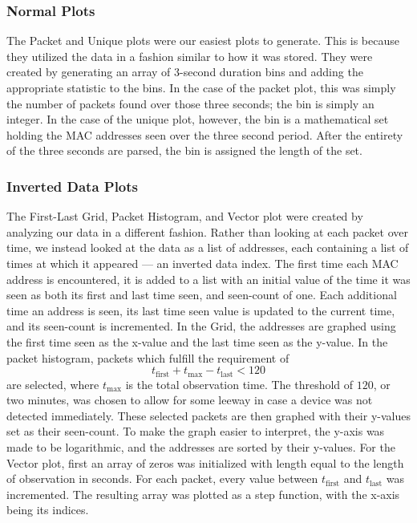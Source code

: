 \subsubsection*{Normal Plots}
The Packet and Unique plots were our easiest plots to generate.
This is because they utilized the data in a fashion similar to how it was stored.
They were created by generating an array of 3-second duration bins and adding the appropriate statistic to the bins.
In the case of the packet plot, this was simply the number of packets found over those three seconds; the bin is simply an integer.
In the case of the unique plot, however, the bin is a mathematical set holding the MAC addresses seen over the three second period.
After the entirety of the three seconds are parsed, the bin is assigned the length of the set.

\subsubsection*{Inverted Data Plots}
The First-Last Grid, Packet Histogram, and Vector plot were created by analyzing our data in a different fashion.
Rather than looking at each packet over time, we instead looked at the data as a list of addresses, each containing a list of times at which it appeared --- an inverted data index.
The first time each MAC address is encountered, it is added to a list with an initial value of the time it was seen as both its first and last time seen, and seen-count of one.
Each additional time an address is seen, its last time seen value is updated to the current time, and its seen-count is incremented.
In the Grid, the addresses are graphed using the first time seen as the x-value and the last time seen as the y-value.
In the packet histogram, packets which fulfill the requirement of \[t_\text{first} + t_\text{max} - t_\text{last} < 120\] are selected, where \(t_\text{max}\) is the total observation time.
The threshold of $120$, or two minutes, was chosen to allow for some leeway in case a device was not detected immediately.
These selected packets are then graphed with their y-values set as their seen-count.
To make the graph easier to interpret, the y-axis was made to be logarithmic, and the addresses are sorted by their y-values.
For the Vector plot, first an array of zeros was initialized with length equal to the length of observation in seconds.
For each packet, every value between \(t_\text{first}\) and \(t_\text{last}\) was incremented.
The resulting array was plotted as a step function, with the x-axis being its indices.

